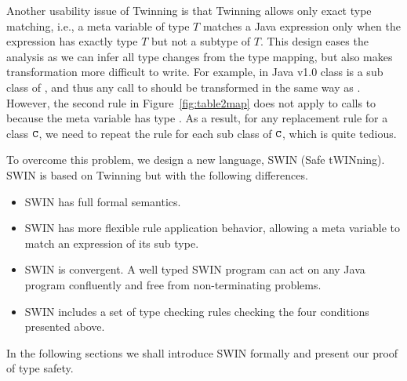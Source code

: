 Another usability issue of Twinning is that Twinning allows only exact
type matching, i.e., a meta variable of type $T$ matches a Java
expression only when the expression has exactly type $T$ but not a subtype of $T$. This design eases the
analysis as we can infer all type changes from the type mapping, but
also makes transformation more difficult to write. For example, in
Java v1.0 class  is a sub class of ,
and thus any call to  should be
transformed in the same way as . However,
the second rule in Figure~\ref{fig:table2map} does not apply to calls
to  because the meta variable 
has type . As a result, for any replacement rule for a
class $\tt C$, we need to repeat the rule for each sub class of $\tt C$, which
is quite tedious.

To overcome this problem, we design a new language, SWIN (Safe
tWINning). SWIN is based on Twinning but with the following
differences.
\begin{itemize}
\item SWIN has full formal semantics.
  \item SWIN has more flexible rule
application behavior, allowing a meta
variable to match an expression of its sub type.

\item SWIN is convergent. A well typed SWIN program can act on any 
    Java program confluently and free from non-terminating problems.
\item SWIN
includes a set of type checking rules checking the four conditions presented
above.
\end{itemize}
In the following sections we shall introduce SWIN formally and
present our proof of type safety.

